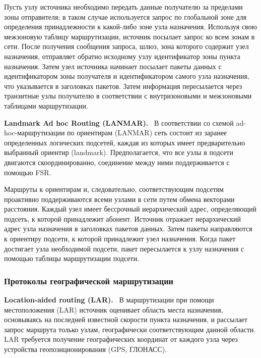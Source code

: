 \documentclass[14pt,a4paper,titlepage]{extarticle}
\renewcommand{\paragraph}[1]{\textbf{#1.}~}
\begin{document}
Пусть узлу источника необходимо передать данные получателю за пределами зоны отправителя; в таком случае используется запрос по глобальной зоне для определения принадлежности к какой-либо зоне узла назначения. Используя свою межзоновую таблицу маршрутизации, источник посылает запрос ко всем зонам в сети. После получения сообщения запроса, шлюз, зона которого содержит узел назначения, отправляет обратно исходному узлу идентификатор зоны пункта назначения. Затем узел источника начинает посылает пакеты данных с идентификатором зоны получателя и идентификатором самого узла назначения, что указывается в заголовках пакетов. Затем информация пересылается через транзитные узлы получателю в соответствии с внутризоновыми и межзоновыми таблицами маршрутизации.

\paragraph{Landmark Ad hoc Routing (LANMAR)}
В соответствии со схемой ad-hoc-маршрутизации по ориентирам (LANMAR) сеть состоит из заранее определенных логических подсетей, каждая из которых имеет предварительно выбранный ориентир (landmark). Предполагается, что все узлы в подсети двигаются скоординированно, соединение между ними поддерживается с помощью FSR. 

Маршруты к ориентирам и, следовательно, соответствующим подсетям проактивно поддерживаются всеми узлами в сети путем обмена векторами расстояния. Каждый узел имеет бессрочный иерархический адрес, определяющий подсеть, к которой принадлежит абонент. Источник отражает иерархический адрес узла назначения в заголовках пакетов данных. Затем пакеты направляются к ориентиру подсети, к которой принадлежит узел назначения. Когда пакет достигает узла необходимой подсети, пакет пересылается к узлу назначения с помощью таблицы маршрутизации подсети.

\subsubsection{Протоколы географической маршрутизации}

\paragraph{Location-aided routing (LAR)}
В маршрутизации при помощи местоположения (LAR) источник оценивает область места назначения, основываясь на последней известной скорости пункта назначения, и рассылает запрос маршрута только узлам, географически соответствующим данной области. LAR требуется получение географических координат от каждого узла через устройства геопозиционирования (GPS, ГЛОНАСС).
\end{document}
